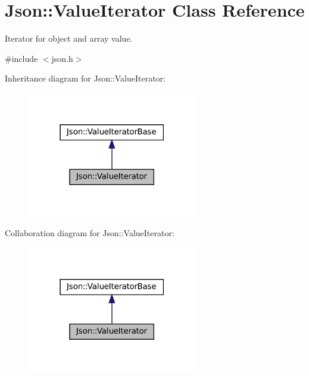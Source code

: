 \hypertarget{classJson_1_1ValueIterator}{}\section{Json\+:\+:Value\+Iterator Class Reference}
\label{classJson_1_1ValueIterator}


Iterator for object and array value.  




{\ttfamily \#include $<$json.\+h$>$}



Inheritance diagram for Json\+:\+:Value\+Iterator\+:
\nopagebreak
\begin{figure}[H]
\begin{center}
\leavevmode
\includegraphics[width=210pt]{classJson_1_1ValueIterator__inherit__graph}
\end{center}
\end{figure}


Collaboration diagram for Json\+:\+:Value\+Iterator\+:
\nopagebreak
\begin{figure}[H]
\begin{center}
\leavevmode
\includegraphics[width=210pt]{classJson_1_1ValueIterator__coll__graph}
\end{center}
\end{figure}
